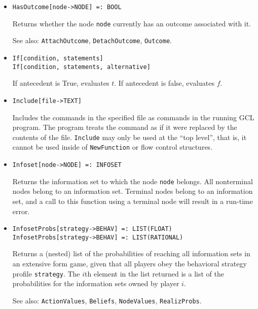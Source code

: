 \begin{itemize}
\item
\protect \large \begin{verbatim}
HasOutcome[node->NODE] =: BOOL
\end{verbatim} \normalsize

\bd
Returns whether the node \verb+node+ currently has an outcome associated
with it.
\item
[See also:] {\tt AttachOutcome}, {\tt DetachOutcome}, {\tt Outcome}.
\ed


\item 
\protect \large \begin{verbatim}
If[condition, statements]
If[condition, statements, alternative]
\end{verbatim} \normalsize
  
\bd
If antecedent is True, evaluates $t$.  If
antecedent is false, evaluates $f$. 
\ed


\item
\protect \large \begin{verbatim}
Include[file->TEXT]
\end{verbatim}\normalsize

\bd
Includes the commands in the specified file as commands
in the running GCL program.  The program treats the command as if it
were replaced by the contents of the file.  \verb+Include+ may only be used
at the ``top level'', that is, it cannot be used inside of \verb+NewFunction+
or flow control structures.
\ed

\item
\protect \large \begin{verbatim}
Infoset[node->NODE] =: INFOSET
\end{verbatim}\normalsize

\bd
Returns the information set to which the node \verb+node+
belongs.  All nonterminal nodes belong to an information set.  Terminal
nodes belong to an information set, and a call to this function using
a terminal node will result in a run-time error.
\ed

\item
\protect \large \begin{verbatim}
InfosetProbs[strategy->BEHAV] =: LIST(FLOAT)
InfosetProbs[strategy->BEHAV] =: LIST(RATIONAL)
\end{verbatim}\normalsize

\bd
Returns a (nested) list of the probabilities of reaching all information
sets in an extensive form game, given that all players obey the
behavioral strategy profile \verb+strategy+.  The $i$th element
in the list returned is a list of the probabilities for the information
sets owned by player $i$.
\item
[See also:] {\tt ActionValues}, {\tt Beliefs}, {\tt NodeValues},
{\tt RealizProbs}.
\ed


\end{itemize}
